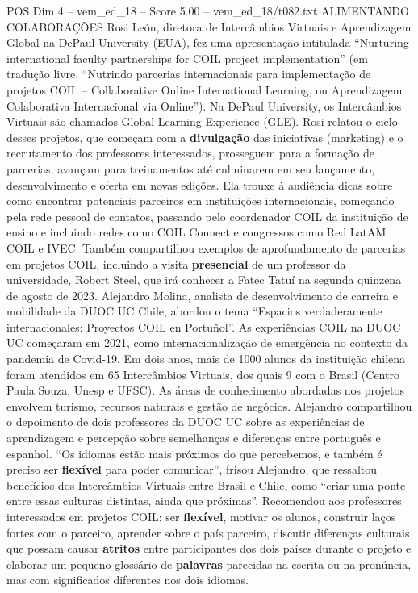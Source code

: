 \begin{textsample}{POS Dim 4 – vem\_ed\_18 – Score 5.00 – vem\_ed\_18/t082.txt}  \label{ex:f4_pos_046}
ALIMENTANDO COLABORAÇÕES Rosi León, diretora de Intercâmbios Virtuais e Aprendizagem Global na DePaul University (EUA), fez uma apresentação intitulada “Nurturing international faculty partnerships for COIL project implementation” (em tradução livre, “Nutrindo parcerias internacionais para implementação de projetos COIL – Collaborative Online International Learning, ou Aprendizagem Colaborativa Internacional via Online”).
Na DePaul University, os Intercâmbios Virtuais são chamados Global Learning Experience (GLE).
Rosi relatou o ciclo desses projetos, que começam com a \textbf{divulgação} das iniciativas (marketing) e o recrutamento dos professores interessados, prosseguem para a formação de parcerias, avançam para treinamentos até culminarem em seu lançamento, desenvolvimento e oferta em novas edições.
Ela trouxe à audiência dicas sobre como encontrar potenciais parceiros em instituições internacionais, começando pela rede pessoal de contatos, passando pelo coordenador COIL da instituição de ensino e incluindo redes como COIL Connect e congressos como Red LatAM COIL e IVEC.
Também compartilhou exemplos de aprofundamento de parcerias em projetos COIL, incluindo a visita \textbf{presencial} de um professor da universidade, Robert Steel, que irá conhecer a Fatec Tatuí na segunda quinzena de agosto de 2023.
Alejandro Molina, analista de desenvolvimento de carreira e mobilidade da DUOC UC Chile, abordou o tema “Espacios verdaderamente internacionales: Proyectos COIL en Portuñol”.
As experiências COIL na DUOC UC começaram em 2021, como internacionalização de emergência no contexto da pandemia de Covid-19.
Em dois anos, mais de 1000 alunos da instituição chilena foram atendidos em 65 Intercâmbios Virtuais, dos quais 9 com o Brasil (Centro Paula Souza, Unesp e UFSC).
As áreas de conhecimento abordadas nos projetos envolvem turismo, recursos naturais e gestão de negócios.
Alejandro compartilhou o depoimento de dois professores da DUOC UC sobre as experiências de aprendizagem e percepção sobre semelhanças e diferenças entre português e espanhol. “Os idiomas estão mais próximos do que percebemos, e também é preciso ser \textbf{flexível} para poder comunicar”, frisou Alejandro, que ressaltou benefícios dos Intercâmbios Virtuais entre Brasil e Chile, como “criar uma ponte entre essas culturas distintas, ainda que próximas”.
Recomendou aos professores interessados em projetos COIL: ser \textbf{flexível}, motivar os alunos, construir laços fortes com o parceiro, aprender sobre o país parceiro, discutir diferenças culturais que possam causar \textbf{atritos} entre participantes dos dois países durante o projeto e elaborar um pequeno glossário de \textbf{palavras} parecidas na escrita ou na pronúncia, mas com significados diferentes nos dois idiomas.

\end{textsample}
